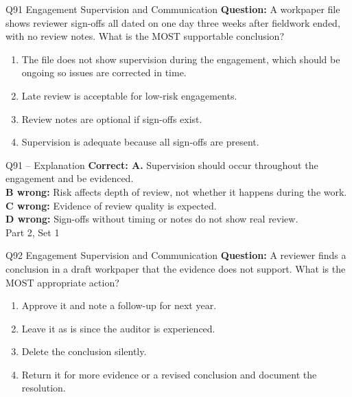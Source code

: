 \documentclass[aspectratio=169,10pt]{beamer}
\begin{document}
\begin{frame}[t]{Q91 \hfill {\scriptsize Engagement Supervision and Communication}}
	\small
	\textbf{Question:} A workpaper file shows reviewer sign-offs all dated on one day three weeks after fieldwork ended, with no review notes. What is the MOST supportable conclusion?
	\begin{enumerate}[label=\Alph*.,itemsep=1pt,topsep=3pt]
			\item The file does not show supervision during the engagement, which should be ongoing so issues are corrected in time.
			\item Late review is acceptable for low-risk engagements.
			\item Review notes are optional if sign-offs exist.
			\item Supervision is adequate because all sign-offs are present.
	\end{enumerate}
\end{frame}
\begin{frame}[t]{Q91 -- Explanation}
	\footnotesize
	\textbf{Correct: A.} Supervision should occur throughout the engagement and be evidenced. \\[5pt]
\textbf{B wrong:} Risk affects depth of review, not whether it happens during the work. \\[3pt]
\textbf{C wrong:} Evidence of review quality is expected. \\[3pt]
\textbf{D wrong:} Sign-offs without timing or notes do not show real review. \\[3pt]
	\vfill {\tiny Part 2, Set 1}
\end{frame}
\begin{frame}[t]{Q92 \hfill {\scriptsize Engagement Supervision and Communication}}
	\small
	\textbf{Question:} A reviewer finds a conclusion in a draft workpaper that the evidence does not support. What is the MOST appropriate action?
	\begin{enumerate}[label=\Alph*.,itemsep=1pt,topsep=3pt]
			\item Approve it and note a follow-up for next year.
			\item Leave it as is since the auditor is experienced.
			\item Delete the conclusion silently.
			\item Return it for more evidence or a revised conclusion and document the resolution.
	\end{enumerate}
\end{frame}
\end{document}
